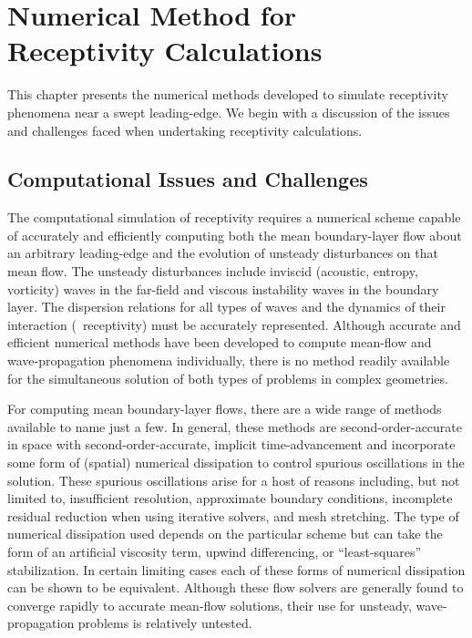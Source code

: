 %
%
%
%
%
\chapter [Numerical Method] {Numerical Method for \protect\\ 
Receptivity Calculations \label{c:method}}

This chapter presents the numerical methods developed to simulate receptivity
phenomena near a swept leading-edge.  We begin with a discussion of the issues
and challenges faced when undertaking receptivity calculations.

\section{Computational Issues and Challenges \label{s:issues} }

The computational simulation of receptivity requires a numerical scheme
capable of accurately and efficiently computing both the mean boundary-layer
flow about an arbitrary leading-edge and the evolution of unsteady
disturbances on that mean flow. The unsteady disturbances include inviscid
(acoustic, entropy, vorticity) waves in the far-field and viscous instability
waves in the boundary layer.  The dispersion relations for all types of waves
and the dynamics of their interaction (\ie\ receptivity) must be accurately
represented.  Although accurate and efficient numerical methods have been
developed to compute mean-flow and wave-propagation phenomena individually,
there is no method readily available for the simultaneous solution of both
types of problems in complex geometries.

For computing mean boundary-layer flows, there are a wide range of methods
available \cite{BeWa:76,Steger:77,vanLeer:77,StWa:81,Shakib:88} to name just a
few.  In general, these methods are second-order-accurate in space with
second-order-accurate, implicit time-advancement and incorporate some form of
(spatial) numerical dissipation to control spurious oscillations in the
solution.  These spurious oscillations arise for a host of reasons including,
but not limited to, insufficient resolution, approximate boundary conditions,
incomplete residual reduction when using iterative solvers, and mesh
stretching.  The type of numerical dissipation used depends on the particular
scheme but can take the form of an artificial viscosity term, upwind
differencing, or ``least-squares'' stabilization.  In certain limiting cases
each of these forms of numerical dissipation can be shown to be
equivalent. Although these flow solvers are generally found to converge
rapidly to accurate mean-flow solutions, their use for unsteady,
wave-propagation problems is relatively untested.
%
%

